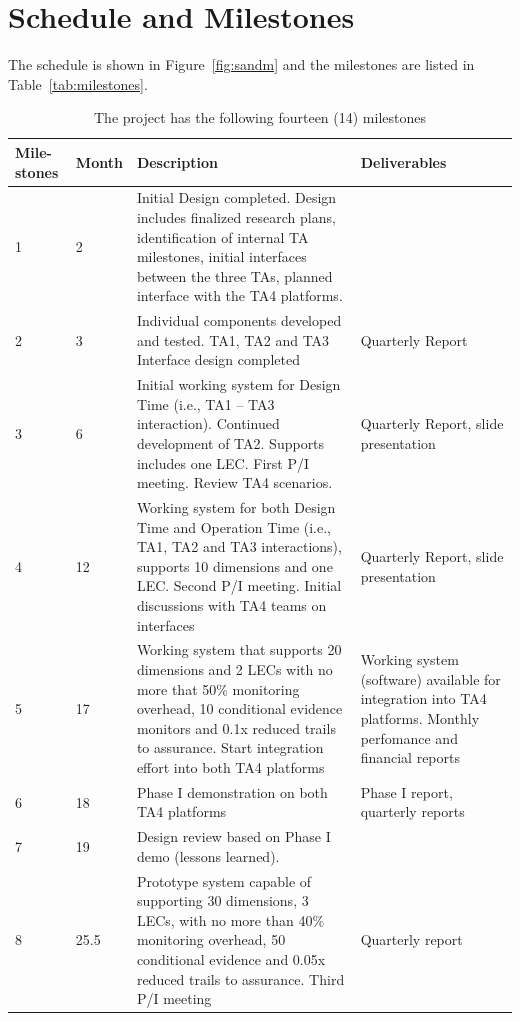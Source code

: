 \clearpage
\newpage
\section{Schedule and Milestones}

The schedule is shown in Figure~\ref{fig:sandm} and the milestones are listed in Table~\ref{tab:milestones}.

\begin{table}[ht]
\centering
\caption{The project has the following fourteen (14) milestones}

{\scriptsize
\begin{tabular}{|m{.25in}|m{.25in}|m{4.0in}|m{1.65in}|} 
\hline
Mile-stones & Month & Description & Deliverables \\ \hline
1 & 2 & Initial Design completed.  Design includes finalized research plans, identification of internal TA milestones, initial interfaces between the three TAs, planned interface with the TA4 platforms. &  \\ \hline
2 & 3 & Individual components developed and tested.   TA1, TA2 and TA3 Interface design completed & Quarterly Report \\ \hline
3 & 6 & Initial working system for Design Time (i.e., TA1 – TA3 interaction).  Continued development of TA2.  Supports includes one LEC.   First P/I meeting.   Review TA4 scenarios. & Quarterly Report, slide presentation \\ \hline
4 & 12 & Working system for both Design Time and Operation Time (i.e., TA1, TA2 and TA3 interactions), supports 10 dimensions and one LEC.  Second P/I meeting.   Initial discussions with TA4 teams on interfaces & Quarterly Report, slide presentation \\ \hline
5 & 17 & Working system that supports 20 dimensions and 2 LECs with no more that 50\% monitoring overhead, 10 conditional evidence monitors and 0.1x reduced trails to assurance.   Start integration effort into both TA4 platforms & Working system (software) available for integration into TA4 platforms.  Monthly perfomance and financial reports \\ \hline
6 & 18 & Phase I demonstration on both TA4 platforms & Phase I report, quarterly reports \\ \hline
7 & 19 & Design review based on Phase I demo (lessons learned). &  \\ \hline
8 & 25.5 & Prototype system capable of supporting 30 dimensions, 3 LECs, with no more than 40\% monitoring overhead, 50 conditional evidence and 0.05x reduced trails to assurance.   Third P/I meeting & Quarterly report \\ \hline

\end{tabular}}
\end{table}
